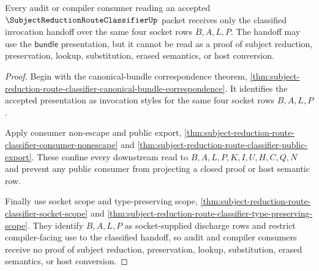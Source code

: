 \begin{theorem}
\label{thm:subject-reduction-route-classifier-audit-handoff}
Every audit or compiler consumer reading an accepted $\SubjectReductionRouteClassifierUp$ packet receives only the classified invocation handoff over the same four socket rows $B,A,L,P$. The handoff may use the $\mathsf{bundle}$ presentation, but it cannot be read as a proof of subject reduction, preservation, lookup, substitution, erased semantics, or host conversion.
\end{theorem}
\begin{proof}
Begin with the canonical-bundle correspondence theorem, \autoref{thm:subject-reduction-route-classifier-canonical-bundle-correspondence}. It identifies the accepted presentation as invocation styles for the same four socket rows $B,A,L,P$.

Apply consumer non-escape and public export, \autoref{thm:subject-reduction-route-classifier-consumer-nonescape} and \autoref{thm:subject-reduction-route-classifier-public-export}. These confine every downstream read to $B,A,L,P,K,I,U,H,C,Q,N$ and prevent any public consumer from projecting a closed proof or host semantic row.

Finally use socket scope and type-preserving scope, \autoref{thm:subject-reduction-route-classifier-socket-scope} and \autoref{thm:subject-reduction-route-classifier-type-preserving-scope}. They identify $B,A,L,P$ as socket-supplied discharge rows and restrict compiler-facing use to the classified handoff, so audit and compiler consumers receive no proof of subject reduction, preservation, lookup, substitution, erased semantics, or host conversion.
\end{proof}

